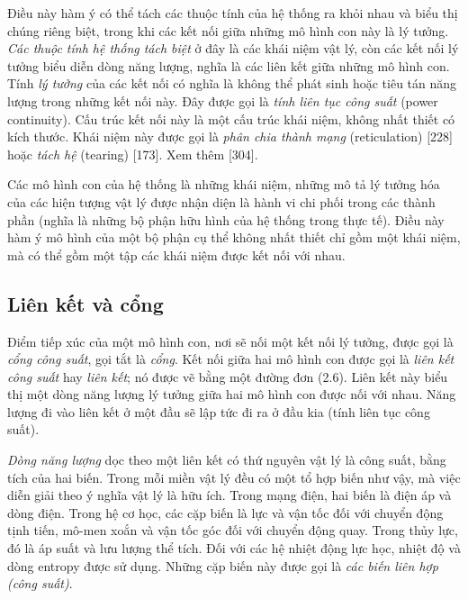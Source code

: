 Điều này hàm ý có thể tách các thuộc tính của hệ thống ra khỏi nhau và biểu thị chúng riêng biệt, trong khi các kết nối giữa những mô hình con này là lý tưởng. \emph{Các thuộc tính hệ thống tách biệt} ở đây là các khái niệm vật lý, còn các kết nối lý tưởng biểu diễn dòng năng lượng, nghĩa là các liên kết giữa những mô hình con. Tính \emph{lý tưởng} của các kết nối có nghĩa là không thể phát sinh hoặc tiêu tán năng lượng trong những kết nối này. Đây được gọi là \emph{tính liên tục công suất} (power continuity). Cấu trúc kết nối này là một cấu trúc khái niệm, không nhất thiết có kích thước. Khái niệm này được gọi là \emph{phân chia thành mạng} (reticulation) [228] hoặc \emph{tách hệ} (tearing) [173]. Xem thêm [304].

Các mô hình con của hệ thống là những khái niệm, những mô tả lý tưởng hóa của các hiện tượng vật lý được nhận diện là hành vi chi phối trong các thành phần (nghĩa là những bộ phận hữu hình của hệ thống trong thực tế). Điều này hàm ý mô hình của một bộ phận cụ thể không nhất thiết chỉ gồm một khái niệm, mà có thể gồm một tập các khái niệm được kết nối với nhau.
\subsection{Liên kết và cổng}
Điểm tiếp xúc của một mô hình con, nơi sẽ nối một kết nối lý tưởng, được gọi là \emph{cổng công suất}, gọi tắt là \emph{cổng}. Kết nối giữa hai mô hình con được gọi là \emph{liên kết công suất} hay \emph{liên kết}; nó được vẽ bằng một đường đơn (2.6). Liên kết này biểu thị một dòng năng lượng lý tưởng giữa hai mô hình con được nối với nhau. Năng lượng đi vào liên kết ở một đầu sẽ lập tức đi ra ở đầu kia (tính liên tục công suất).

\emph{Dòng năng lượng} dọc theo một liên kết có thứ nguyên vật lý là công suất, bằng tích của hai biến. Trong mỗi miền vật lý đều có một tổ hợp biến như vậy, mà việc diễn giải theo ý nghĩa vật lý là hữu ích. Trong mạng điện, hai biến là điện áp và dòng điện. Trong hệ cơ học, các cặp biến là lực và vận tốc đối với chuyển động tịnh tiến, mô-men xoắn và vận tốc góc đối với chuyển động quay. Trong thủy lực, đó là áp suất và lưu lượng thể tích. Đối với các hệ nhiệt động lực học, nhiệt độ và dòng entropy được sử dụng. Những cặp biến này được gọi là \emph{các biến liên hợp (công suất)}.

